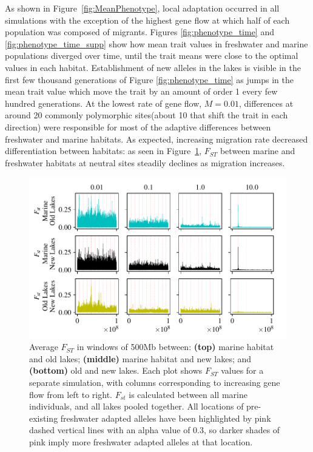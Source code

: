 \documentclass{article}
\begin{document}
As shown in Figure~\ref{fig:MeanPhenotype}, local adaptation occurred in all simulations with the exception of the highest gene flow at which half of each population was composed of migrants. Figures \ref{fig:phenotype_time} and \ref{fig:phenotype_time_supp} show how mean trait values in freshwater and marine populations diverged over time, until the trait means were close to the optimal values in each habitat. Establishment of new alleles in the lakes is visible in the first few thousand generations of Figure \ref{fig:phenotype_time} as jumps in the mean trait value which move the trait by an amount of order 1 every few hundred generations.
At the lowest rate of gene flow, $M = 0.01$, differences at around 20 commonly polymorphic sites(about 10 that shift the trait in each direction) were responsible for most of the adaptive differences between freshwater and marine habitats. As expected, increasing migration rate decreased differentiation between habitats: as seen in Figure~\ref{fig:Fst}, $F_{ST}$ between marine and freshwater habitats at neutral sites steadily declines as migration increases. 

\begin{figure}
    \begin{center}
        \includegraphics[width=\textwidth]{Final_Plots/Fst_Genome_faa.pdf}
          \caption{
        Average $F_{ST}$ in windows of 500Mb between:
        \textbf{(top)} marine habitat and old lakes;
        \textbf{(middle)} marine habitat and new lakes; and
        \textbf{(bottom)} old and new lakes.
        Each plot shows $F_{ST}$ values for a separate simulation,
        with columns corresponding to increasing gene flow from left to right.
        $F_{st}$ is calculated between all marine individuals, and all lakes pooled together.
        All locations of pre-existing freshwater adapted alleles have been highlighted by 
        pink dashed vertical lines with an alpha value of 0.3, so darker shades of pink imply more 
        freshwater adapted alleles at that location.
     } \label{fig:Fst}
    \end{center}
\end{figure}
\end{document}
